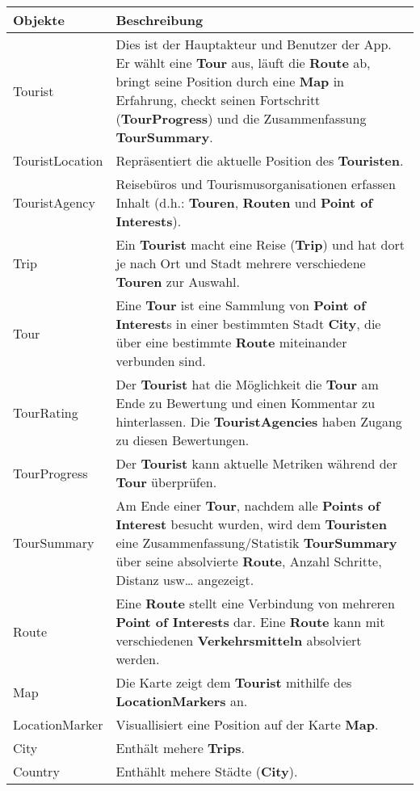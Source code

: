 \begin{longtabu} to \textwidth { | l | X[l] | }
\hline
\textbf{Objekte} & \textbf{Beschreibung} \\\hline
\endhead

Tourist & Dies ist der Hauptakteur und Benutzer der App. Er wählt eine \textbf{Tour} aus, läuft die \textbf{Route} ab, bringt seine Position durch eine \textbf{Map} in Erfahrung, checkt seinen Fortschritt (\textbf{TourProgress}) und die Zusammenfassung \textbf{TourSummary}. \\\hline
TouristLocation & Repräsentiert die aktuelle Position des \textbf{Touristen}. \\\hline
TouristAgency & Reisebüros und Tourismusorganisationen erfassen Inhalt (d.h.: \textbf{Touren}, \textbf{Routen} und \textbf{Point of Interests}).\\\hline
Trip & Ein \textbf{Tourist} macht eine Reise (\textbf{Trip}) und hat dort je nach Ort und Stadt mehrere verschiedene \textbf{Touren} zur Auswahl.\\\hline
Tour & Eine \textbf{Tour} ist eine Sammlung von \textbf{Point of Interest}s in einer bestimmten Stadt \textbf{City}, die über eine bestimmte \textbf{Route} miteinander verbunden sind.\\\hline
TourRating & Der \textbf{Tourist} hat die Möglichkeit die \textbf{Tour} am Ende zu Bewertung und einen Kommentar zu hinterlassen. Die \textbf{TouristAgencies} haben Zugang zu diesen Bewertungen.\\\hline
TourProgress & Der \textbf{Tourist} kann aktuelle Metriken während der \textbf{Tour} überprüfen. \\\hline
TourSummary & Am Ende einer \textbf{Tour}, nachdem alle \textbf{Points of Interest}  besucht wurden, wird dem \textbf{Touristen} eine Zusammenfassung/Statistik \textbf{TourSummary} über seine absolvierte \textbf{Route}, Anzahl Schritte, Distanz usw\ldots{} angezeigt.\\\hline
Route & Eine \textbf{Route} stellt eine Verbindung von mehreren \textbf{Point of Interests} dar. Eine \textbf{Route} kann mit verschiedenen \textbf{Verkehrsmitteln} absolviert werden.\\\hline
Map & Die Karte zeigt dem \textbf{Tourist} mithilfe des \textbf{LocationMarkers} an. \\\hline
LocationMarker & Visuallisiert eine Position auf der Karte \textbf{Map}. \\\hline
City & Enthält mehere \textbf{Trips}. \\\hline
Country & Enthählt mehere Städte (\textbf{City}).\\\hline

\end{longtabu}
